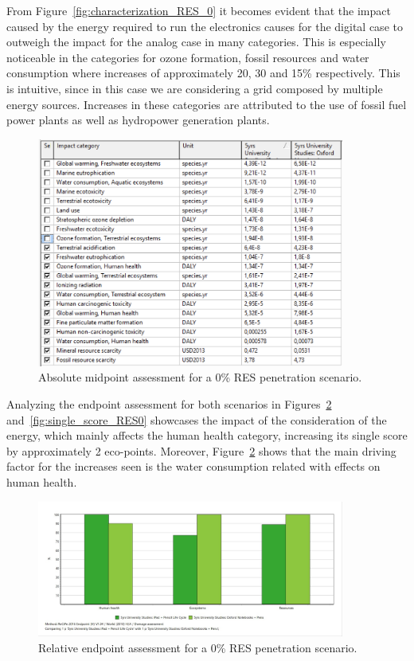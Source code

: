 From Figure~\ref{fig:characterization_RES_0} it becomes evident that the impact caused by the energy required to run the electronics causes for the digital case to outweigh the impact for the analog case in many categories. This is especially noticeable in the categories for ozone formation, fossil resources and water consumption where increases of approximately 20, 30 and 15\% respectively. This is intuitive, since in this case we are considering a grid composed by multiple energy sources. Increases in these categories are attributed to the use of fossil fuel power plants as well as hydropower generation plants. 

\begin{figure}[H]
    \centering
    \includegraphics[width=0.9\textwidth]{images/RES_0/Characterization_Table_RES_0.PNG}
    \caption{Absolute midpoint assessment for a 0\% RES penetration scenario.}\label{fig:characterization_table_RES_0}
\end{figure}

Analyzing the endpoint assessment for both scenarios in Figures~\ref{fig:damage_assessment_RES_0} and~\ref{fig:single_score_RES0} showcases the impact of the consideration of the energy, which mainly affects the human health category, increasing its single score by approximately 2 eco-points. Moreover, Figure~\ref{fig:damage_assessment_RES_0} shows that the main driving factor for the increases seen is the water consumption related with effects on human health.

\begin{figure}[H]
    \centering
    \includegraphics[width=0.9\textwidth]{images/RES_0/Damage_Assessment_RES_0.JPG}
    \caption{Relative endpoint assessment for a 0\% RES penetration scenario.}\label{fig:damage_assessment_RES_0}
\end{figure}

